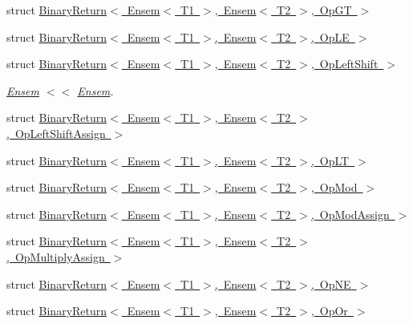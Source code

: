 \begin{DoxyCompactItemize}
\item 
struct \mbox{\hyperlink{structENSEM_1_1BinaryReturn_3_01Ensem_3_01T1_01_4_00_01Ensem_3_01T2_01_4_00_01OpGT_01_4}{Binary\+Return$<$ Ensem$<$ T1 $>$, Ensem$<$ T2 $>$, Op\+G\+T $>$}}
\item 
struct \mbox{\hyperlink{structENSEM_1_1BinaryReturn_3_01Ensem_3_01T1_01_4_00_01Ensem_3_01T2_01_4_00_01OpLE_01_4}{Binary\+Return$<$ Ensem$<$ T1 $>$, Ensem$<$ T2 $>$, Op\+L\+E $>$}}
\item 
struct \mbox{\hyperlink{structENSEM_1_1BinaryReturn_3_01Ensem_3_01T1_01_4_00_01Ensem_3_01T2_01_4_00_01OpLeftShift_01_4}{Binary\+Return$<$ Ensem$<$ T1 $>$, Ensem$<$ T2 $>$, Op\+Left\+Shift $>$}}
\begin{DoxyCompactList}\small\item\em \mbox{\hyperlink{classENSEM_1_1Ensem}{Ensem}} $<$$<$ \mbox{\hyperlink{classENSEM_1_1Ensem}{Ensem}}. \end{DoxyCompactList}\item 
struct \mbox{\hyperlink{structENSEM_1_1BinaryReturn_3_01Ensem_3_01T1_01_4_00_01Ensem_3_01T2_01_4_00_01OpLeftShiftAssign_01_4}{Binary\+Return$<$ Ensem$<$ T1 $>$, Ensem$<$ T2 $>$, Op\+Left\+Shift\+Assign $>$}}
\item 
struct \mbox{\hyperlink{structENSEM_1_1BinaryReturn_3_01Ensem_3_01T1_01_4_00_01Ensem_3_01T2_01_4_00_01OpLT_01_4}{Binary\+Return$<$ Ensem$<$ T1 $>$, Ensem$<$ T2 $>$, Op\+L\+T $>$}}
\item 
struct \mbox{\hyperlink{structENSEM_1_1BinaryReturn_3_01Ensem_3_01T1_01_4_00_01Ensem_3_01T2_01_4_00_01OpMod_01_4}{Binary\+Return$<$ Ensem$<$ T1 $>$, Ensem$<$ T2 $>$, Op\+Mod $>$}}
\item 
struct \mbox{\hyperlink{structENSEM_1_1BinaryReturn_3_01Ensem_3_01T1_01_4_00_01Ensem_3_01T2_01_4_00_01OpModAssign_01_4}{Binary\+Return$<$ Ensem$<$ T1 $>$, Ensem$<$ T2 $>$, Op\+Mod\+Assign $>$}}
\item 
struct \mbox{\hyperlink{structENSEM_1_1BinaryReturn_3_01Ensem_3_01T1_01_4_00_01Ensem_3_01T2_01_4_00_01OpMultiplyAssign_01_4}{Binary\+Return$<$ Ensem$<$ T1 $>$, Ensem$<$ T2 $>$, Op\+Multiply\+Assign $>$}}
\item 
struct \mbox{\hyperlink{structENSEM_1_1BinaryReturn_3_01Ensem_3_01T1_01_4_00_01Ensem_3_01T2_01_4_00_01OpNE_01_4}{Binary\+Return$<$ Ensem$<$ T1 $>$, Ensem$<$ T2 $>$, Op\+N\+E $>$}}
\item 
struct \mbox{\hyperlink{structENSEM_1_1BinaryReturn_3_01Ensem_3_01T1_01_4_00_01Ensem_3_01T2_01_4_00_01OpOr_01_4}{Binary\+Return$<$ Ensem$<$ T1 $>$, Ensem$<$ T2 $>$, Op\+Or $>$}}

\end{DoxyCompactItemize}
